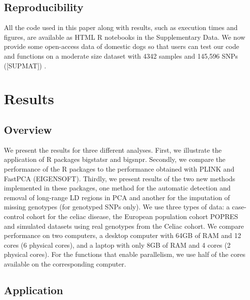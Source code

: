 \documentclass{bioinfo}
\begin{document}
\begin{methods}
\subsection{Reproducibility}

All the code used in this paper along with results, such as execution times and figures, are available as HTML R notebooks in the Supplementary Data. 
{\color{red}
We now provide some open-access data of domestic dogs so that users can test our code and functions on a moderate size dataset with 4342 samples and 145,596 SNPs ([SUPMAT]) \cite[]{hayward2016complex}.
}

\end{methods}

\section{Results}

\subsection{Overview}\label{sec:overview}

We present the results for three different analyses. First, we illustrate the application of R packages bigstatsr and bigsnpr. Secondly, we compare the performance of the R packages to the performance obtained with PLINK and FastPCA (EIGENSOFT). Thirdly, we present results of the two new methods implemented in these packages, one method for the automatic detection and removal of long-range LD regions in PCA and another for the imputation of missing genotypes {\color{red} (for genotyped SNPs only)}. We use three types of data: a case-control cohort for the celiac disease, the European population cohort POPRES and simulated datasets using real genotypes from the Celiac cohort. We compare performance on two computers, a desktop computer with 64GB of RAM and 12 cores (6 physical cores), and a laptop with only 8GB of RAM and 4 cores (2 physical cores). For the functions that enable parallelism, we use half of the cores available on the corresponding computer.

\subsection{Application}
 
\end{document}
